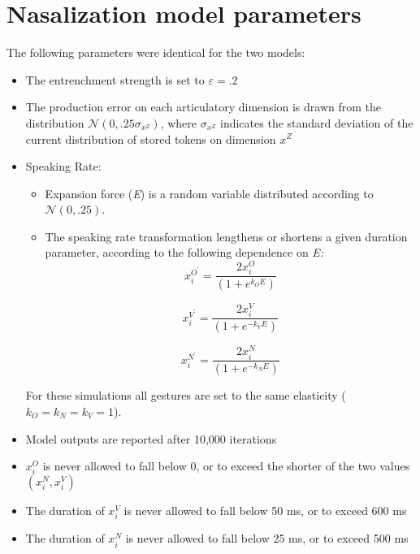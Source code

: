 \chapter{\label{chap:Appendix E}Nasalization model parameters}

The following parameters were identical for the two models:
\begin{itemize}
\item The entrenchment strength is set to $\varepsilon=.2$
\item The production error on each articulatory dimension is drawn from
the distribution $\mathcal{\mathscr{N}}\left(0,.25\sigma_{x^{Z}}\right)$,
where $\sigma_{x^{Z}}$ indicates the standard deviation of the current
distribution of stored tokens on dimension $x^{Z}$
\item Speaking Rate:
\begin{itemize}
\item Expansion force (\emph{E}) is a random variable distributed according
to $\mathcal{\mathscr{N}\left(\mathrm{0,.25}\right)}$. 
\item The speaking rate transformation lengthens or shortens a given duration
parameter, according to the following dependence on \emph{E:}
\begin{equation}
x_{i}^{O^{\prime}}=\frac{2x_{i}^{O}}{(1+e^{k_{O}E})}\label{eq:Speaking rate transform-1}
\end{equation}

\begin{equation}
x_{i}^{V^{\prime}}=\frac{2x_{i}^{V}}{(1+e^{-k_{V}E})}\label{eq:Speaking rate transform-1-1}
\end{equation}

\begin{equation}
x_{i}^{N^\prime}=\frac{2x_{i}^{N}}{(1+e^{-k_{N}E})}\label{eq:Speaking rate transform-1-1-1}
\end{equation}

\end{itemize}
For these simulations all gestures are set to the same elasticity
($k_{O}=k_{N}=k_{V}=1$). 
\item Model outputs are reported after 10,000 iterations
\item $x_{i}^{O}$ is never allowed to fall below 0, or to exceed the shorter
of the two values $(x_{i}^{N},x_{i}^{V})$
\item The duration of $x_{i}^{V}$ is never allowed to fall below 50 ms,
or to exceed 600 ms
\item The duration of $x_{i}^{N}$ is never allowed to fall below 25 ms,
or to exceed 500 ms
\end{itemize}

